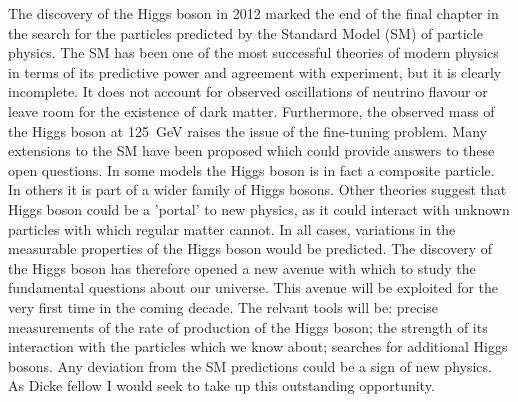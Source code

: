 \documentclass[11pt,a4paper,sans]{moderncv}        %
\begin{document}
\recipient{}{}
\date{\today}
\opening{}
\closing{}
\enclosure[]{}          %
\makelettertitle

The discovery of the Higgs boson in 2012 marked the end of the final chapter in the search for the particles predicted by the Standard Model (SM) of particle physics. The SM has been one of the most successful theories of modern physics in terms of its predictive power and agreement with experiment, but it is clearly incomplete. It does not account for observed oscillations of neutrino flavour or leave room for the existence of dark matter. Furthermore, the observed mass of the Higgs boson at 125~GeV raises the issue of the fine-tuning problem. Many extensions to the SM have been proposed which could provide answers to these open questions. In some models the Higgs boson is in fact a composite particle. In others it is part of a wider family of Higgs bosons. Other theories suggest that Higgs boson could be a 'portal' to new physics, as it could interact with unknown particles with which regular matter cannot. In all cases, variations in the measurable properties of the Higgs boson would be predicted. The discovery of the Higgs boson has therefore opened a new avenue with which to study the fundamental questions about our universe. This avenue will be exploited for the very first time in the coming decade. The relvant tools will be: precise measurements of the rate of production of the Higgs boson; the strength of its interaction with the particles which we know about; searches for additional Higgs bosons. Any deviation from the SM predictions could be a sign of new physics. As Dicke fellow I would seek to take up this outstanding opportunity.
\end{document}
